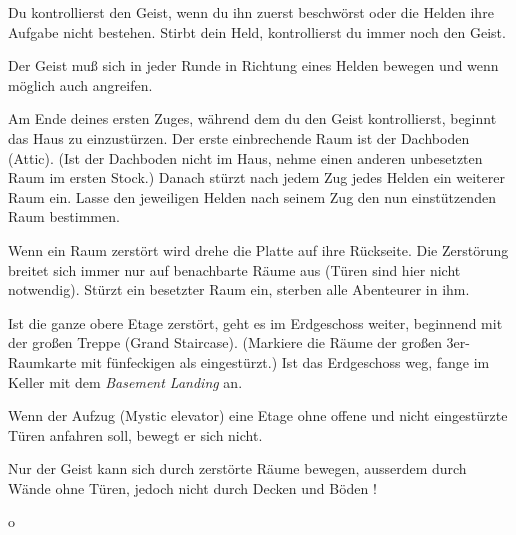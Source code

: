 
  \begin{itemize}
        \bitem Du kontrollierst den Geist, wenn du ihn zuerst beschwörst oder die Helden ihre Aufgabe nicht bestehen. Stirbt dein Held, kontrollierst du immer noch den Geist.

        \bitem Der Geist muß sich in jeder Runde in Richtung eines Helden bewegen und wenn möglich auch angreifen.

        \bitem Am Ende deines ersten Zuges, während dem du den Geist kontrollierst, beginnt das Haus zu einzustürzen. Der erste einbrechende Raum ist der Dachboden (Attic). (Ist der Dachboden nicht im Haus, nehme einen anderen unbesetzten Raum im ersten Stock.) Danach stürzt nach jedem Zug jedes Helden ein weiterer Raum ein. Lasse den jeweiligen Helden nach seinem Zug den nun einstützenden Raum bestimmen.

        \bitem Wenn ein Raum zerstört wird drehe die Platte auf ihre Rückseite. Die Zerstörung breitet sich immer nur auf benachbarte Räume aus (Türen sind hier nicht notwendig). Stürzt ein besetzter Raum ein,  sterben alle Abenteurer in ihm.

        \bitem Ist die ganze obere Etage zerstört, geht es im Erdgeschoss weiter, beginnend mit der großen Treppe (Grand Staircase). (Markiere die Räume der großen 3er-Raumkarte mit fünfeckigen  als eingestürzt.) Ist das Erdgeschoss weg, fange im Keller mit dem \emph{Basement Landing} an.

        \bitem Wenn der Aufzug (Mystic elevator) eine Etage ohne offene und nicht eingestürzte Türen anfahren soll, bewegt er sich nicht.

        \bitem Nur der Geist kann sich durch zerstörte Räume bewegen, ausserdem durch Wände ohne Türen, jedoch nicht durch Decken und Böden !
    \end{itemize}


o